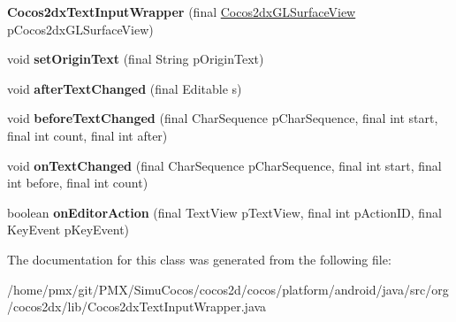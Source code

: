 \begin{DoxyCompactItemize}
{\bfseries Cocos2dx\+Text\+Input\+Wrapper} (final \hyperlink{classorg_1_1cocos2dx_1_1lib_1_1Cocos2dxGLSurfaceView}{Cocos2dx\+G\+L\+Surface\+View} p\+Cocos2dx\+G\+L\+Surface\+View)
\item 
\mbox{\label{classorg_1_1cocos2dx_1_1lib_1_1Cocos2dxTextInputWrapper_a5bc68fe140249a8ef9e3a6106b4bcd9c}} 
void {\bfseries set\+Origin\+Text} (final String p\+Origin\+Text)
\item 
\mbox{\label{classorg_1_1cocos2dx_1_1lib_1_1Cocos2dxTextInputWrapper_aff7227d926fb6b99924db8f895dc3da0}} 
void {\bfseries after\+Text\+Changed} (final Editable s)
\item 
\mbox{\label{classorg_1_1cocos2dx_1_1lib_1_1Cocos2dxTextInputWrapper_acf8a37a45e6dbfc1cf6ef2d8eb0559d9}} 
void {\bfseries before\+Text\+Changed} (final Char\+Sequence p\+Char\+Sequence, final int start, final int count, final int after)
\item 
\mbox{\label{classorg_1_1cocos2dx_1_1lib_1_1Cocos2dxTextInputWrapper_ad821c3c8e35e975a157f5d0282034e3a}} 
void {\bfseries on\+Text\+Changed} (final Char\+Sequence p\+Char\+Sequence, final int start, final int before, final int count)
\item 
\mbox{\label{classorg_1_1cocos2dx_1_1lib_1_1Cocos2dxTextInputWrapper_a9bd2845f3814124988e0751e3a6109bb}} 
boolean {\bfseries on\+Editor\+Action} (final Text\+View p\+Text\+View, final int p\+Action\+ID, final Key\+Event p\+Key\+Event)
\end{DoxyCompactItemize}


The documentation for this class was generated from the following file\+:\begin{DoxyCompactItemize}
\item 
/home/pmx/git/\+P\+M\+X/\+Simu\+Cocos/cocos2d/cocos/platform/android/java/src/org/cocos2dx/lib/Cocos2dx\+Text\+Input\+Wrapper.\+java\end{DoxyCompactItemize}
